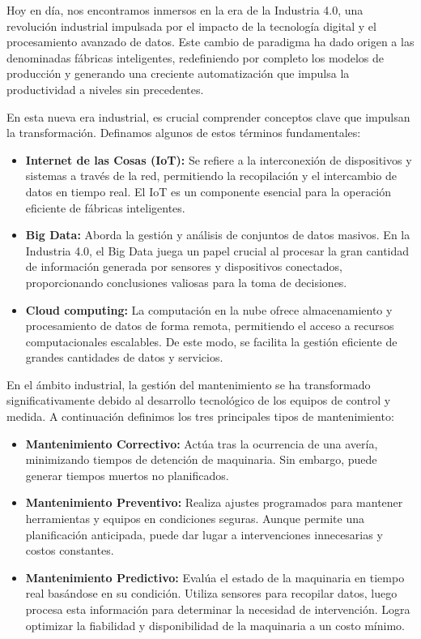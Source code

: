 \documentclass{article}
\begin{document}
Hoy en día, nos encontramos inmersos en la era de la Industria 4.0, una revolución industrial impulsada por el impacto de la tecnología digital y el procesamiento avanzado de datos. Este cambio de paradigma ha dado origen a las denominadas fábricas inteligentes, redefiniendo por completo los modelos de producción y generando una creciente automatización que impulsa la productividad a niveles sin precedentes.

En esta nueva era industrial, es crucial comprender conceptos clave que impulsan la transformación. Definamos algunos de estos términos fundamentales:

\begin{itemize}

    \item \textbf{Internet de las Cosas (IoT):} Se refiere a la interconexión de dispositivos y sistemas a través de la red, permitiendo la recopilación y el intercambio de datos en tiempo real. El IoT es un componente esencial para la operación eficiente de fábricas inteligentes.

    \item \textbf{Big Data:} Aborda la gestión y análisis de conjuntos de datos masivos. En la Industria 4.0, el Big Data juega un papel crucial al procesar la gran cantidad de información generada por sensores y dispositivos conectados, proporcionando conclusiones valiosas para la toma de decisiones. 
  
    \item \textbf{Cloud computing:} La computación en la nube ofrece almacenamiento y procesamiento de datos de forma remota, permitiendo el acceso a recursos computacionales escalables. De este modo, se facilita la gestión eficiente de grandes cantidades de datos y servicios.
    
\end{itemize}

En el ámbito industrial, la gestión del mantenimiento se ha transformado significativamente debido al desarrollo tecnológico de los equipos de control y medida. A continuación definimos los tres principales tipos de mantenimiento:

\begin{itemize}
    \item \textbf{Mantenimiento Correctivo:} Actúa tras la ocurrencia de una avería, minimizando tiempos de detención de maquinaria. Sin embargo, puede generar tiempos muertos no planificados.

    \item \textbf{Mantenimiento Preventivo:} Realiza ajustes programados para mantener herramientas y equipos en condiciones seguras. Aunque permite una planificación anticipada, puede dar lugar a intervenciones innecesarias y costos constantes.

    \item \textbf{Mantenimiento Predictivo:} Evalúa el estado de la maquinaria en tiempo real basándose en su condición. Utiliza sensores para recopilar datos, luego procesa esta información para determinar la necesidad de intervención. Logra optimizar la fiabilidad y disponibilidad de la maquinaria a un costo mínimo.
    
\end{itemize}
\end{document}
